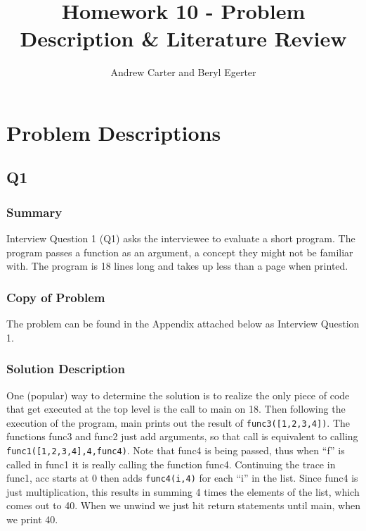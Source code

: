 \documentclass{article}
\title{Homework 10 - Problem Description \& Literature Review}
\author{Andrew Carter and Beryl Egerter}
\begin{document}
\maketitle
\section{Problem Descriptions}


\subsection{Q1}
\subsubsection{Summary}
Interview Question 1 (Q1) asks the interviewee to evaluate a short program.
The program passes a function as an argument, a concept they might not be familiar with.
The program is 18 lines long and takes up less than a page when printed.
\subsubsection{Copy of Problem}
The problem can be found in the Appendix attached below as Interview Question 1.
\subsubsection{Solution Description}
One (popular) way to determine the solution is to realize the only piece of code that get executed at the top level is the call to main on 18.
Then following the execution of the program, main prints out the result of \texttt{func3([1,2,3,4])}.
The functions func3 and func2 just add arguments, so that call is equivalent to calling \texttt{func1([1,2,3,4],4,func4)}.
Note that func4 is being passed, thus when ``f'' is called in func1 it is really calling the function func4.
Continuing the trace in func1, acc starts at $0$ then adds \texttt{func4(i,4)} for each ``i'' in the list.
Since func4 is just multiplication, this results in summing 4 times the elements of the list, which comes out to 40.
When we unwind we just hit return statements until main, when we print 40.
\newpage
\end{document}
